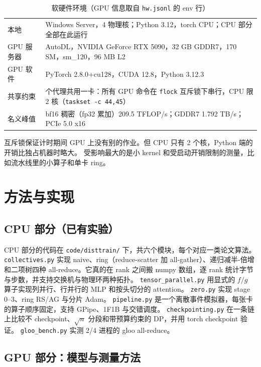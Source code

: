 \documentclass[11pt,a4paper]{ctexart}
\begin{document}
\begin{table}[H]\centering\small
\caption{软硬件环境（GPU 信息取自 \texttt{hw.jsonl} 的 env 行）}
\begin{tabularx}{\linewidth}{l>{\raggedright\arraybackslash}X}
\toprule
本地 & Windows Server，4 物理核；Python 3.12，torch CPU；CPU 部分全部在此运行 \\
GPU 服务器 & AutoDL，NVIDIA GeForce RTX 5090，32 GB GDDR7，170 SM，sm\_120，96 MB L2 \\
GPU 软件 & PyTorch 2.8.0+cu128，CUDA 12.8，Python 3.12.3 \\
共享约束 & 7 个代理共用一卡：所有 GPU 命令在 \texttt{flock} 互斥锁下串行，CPU 限 2 核（\texttt{taskset -c 44,45}） \\
名义峰值 & bf16 稠密（fp32 累加）209.5 TFLOP/s；GDDR7 1.792 TB/s；PCIe 5.0 x16 \\
\bottomrule
\end{tabularx}
\end{table}
互斥锁保证计时期间 GPU 上没有别的作业。但 CPU 只有 2 个核，Python 端的开销比独占机器时略大。
受影响最大的是小 kernel 和受启动开销限制的测量，比如流水线里的小算子和单卡 ring。

\section{方法与实现}
\subsection{CPU 部分（已有实验）}
CPU 部分的代码在 \texttt{code/disttrain/} 下，共六个模块，每个对应一类论文算法。
\texttt{collectives.py} 实现 naive、ring（reduce-scatter 加 all-gather）、递归减半-倍增和二项树四种 all-reduce。它真的在 rank 之间搬 numpy 数组，逐 rank 统计字节与步数，并支持交换机与物理环两种拓扑。
\texttt{tensor\_parallel.py} 用显式的 $f/g$ 算子实现列并行、行并行的 MLP 和按头切分的 attention。
\texttt{zero.py} 实现 stage 0--3、ring RS/AG 与分片 Adam。
\texttt{pipeline.py} 是一个离散事件模拟器，每张卡的算子顺序固定，支持 GPipe、1F1B 与交错调度。
\texttt{checkpointing.py} 在一条链上比较不 checkpoint、$\sqrt n$ 分段和带预算约束的 DP，并用 torch checkpoint 验证。
\texttt{gloo\_bench.py} 实测 2/4 进程的 gloo all-reduce。

\subsection{GPU 部分：模型与测量方法}
\end{document}
